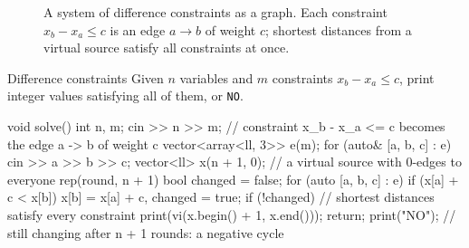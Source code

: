 \begin{figure}[htbp]
\centering
{}
\caption{A system of difference constraints as a graph. Each constraint $x_b - x_a \le c$ is an edge $a \to b$ of weight $c$;
shortest distances from a virtual source satisfy all constraints at once.}
\label{fig:diffcons}
\end{figure}

\begin{problem}{Difference constraints}
Given $n$ variables and $m$ constraints $x_b - x_a \le c$, print integer values satisfying all of them, or \texttt{NO}.
\end{problem}

\begin{code}
void solve() {
    int n, m;
    cin >> n >> m;
    // constraint x_b - x_a <= c becomes the edge a -> b of weight c
    vector<array<ll, 3>> e(m);
    for (auto& [a, b, c] : e) cin >> a >> b >> c;
    vector<ll> x(n + 1, 0);  // a virtual source with 0-edges to everyone
    rep(round, n + 1) {
        bool changed = false;
        for (auto [a, b, c] : e)
            if (x[a] + c < x[b]) x[b] = x[a] + c, changed = true;
        if (!changed) {  // shortest distances satisfy every constraint
            print(vi(x.begin() + 1, x.end()));
            return;
        }
    }
    print("NO");  // still changing after n + 1 rounds: a negative cycle
}
\end{code}

